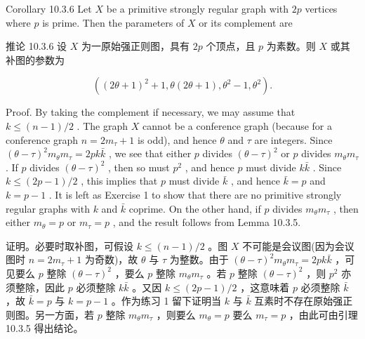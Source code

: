 \documentclass[10pt]{article}
\begin{document}
Corollary 10.3.6 Let \(X\) be a primitive strongly regular graph with \({2p}\) vertices where \(p\) is prime. Then the parameters of \(X\) or its complement are

\begin{tcolorbox}\relax
推论 10.3.6 设 \(X\) 为一原始强正则图，具有 \({2p}\) 个顶点，且 \(p\) 为素数。则 \(X\) 或其补图的参数为
\end{tcolorbox}

\[
\left( {{\left( 2\theta  + 1\right) }^{2} + 1,\theta \left( {{2\theta } + 1}\right) ,{\theta }^{2} - 1,{\theta }^{2}}\right) .
\]

Proof. By taking the complement if necessary, we may assume that \(k \leq  \left( {n - 1}\right) /2\) . The graph \(X\) cannot be a conference graph (because for a conference graph \(n = 2{m}_{\tau } + 1\) is odd), and hence \(\theta\) and \(\tau\) are integers. Since \({\left( \theta  - \tau \right) }^{2}{m}_{\theta }{m}_{\tau } = {2pk}\bar{k}\) , we see that either \(p\) divides \({\left( \theta  - \tau \right) }^{2}\) or \(p\) divides \({m}_{\theta }{m}_{\tau }\) . If \(p\) divides \({\left( \theta  - \tau \right) }^{2}\) , then so must \({p}^{2}\) , and hence \(p\) must divide \(k\bar{k}\) . Since \(k \leq  \left( {{2p} - 1}\right) /2\) , this implies that \(p\) must divide \(\bar{k}\) , and hence \(\bar{k} = p\) and \(k = p - 1\) . It is left as Exercise 1 to show that there are no primitive strongly regular graphs with \(k\) and \(\bar{k}\) coprime. On the other hand, if \(p\) divides \({m}_{\theta }{m}_{\tau }\) , then either \({m}_{\theta } = p\) or \({m}_{\tau } = p\) , and the result follows from Lemma 10.3.5.

\begin{tcolorbox}\relax
证明。必要时取补图，可假设 \(k \leq  \left( {n - 1}\right) /2\) 。图 \(X\) 不可能是会议图(因为会议图时 \(n = 2{m}_{\tau } + 1\) 为奇数)，故 \(\theta\) 与 \(\tau\) 为整数。由于 \({\left( \theta  - \tau \right) }^{2}{m}_{\theta }{m}_{\tau } = {2pk}\bar{k}\) ，可见要么 \(p\) 整除 \({\left( \theta  - \tau \right) }^{2}\) ，要么 \(p\) 整除 \({m}_{\theta }{m}_{\tau }\) 。若 \(p\) 整除 \({\left( \theta  - \tau \right) }^{2}\) ，则 \({p}^{2}\) 亦须整除，因此 \(p\) 必须整除 \(k\bar{k}\) 。又因 \(k \leq  \left( {{2p} - 1}\right) /2\) ，这意味着 \(p\) 必须整除 \(\bar{k}\) ，故 \(\bar{k} = p\) 与 \(k = p - 1\) 。作为练习 1 留下证明当 \(k\) 与 \(\bar{k}\) 互素时不存在原始强正则图。另一方面，若 \(p\) 整除 \({m}_{\theta }{m}_{\tau }\) ，则要么 \({m}_{\theta } = p\) 要么 \({m}_{\tau } = p\) ，由此可由引理 10.3.5 得出结论。
\end{tcolorbox}
\end{document}
